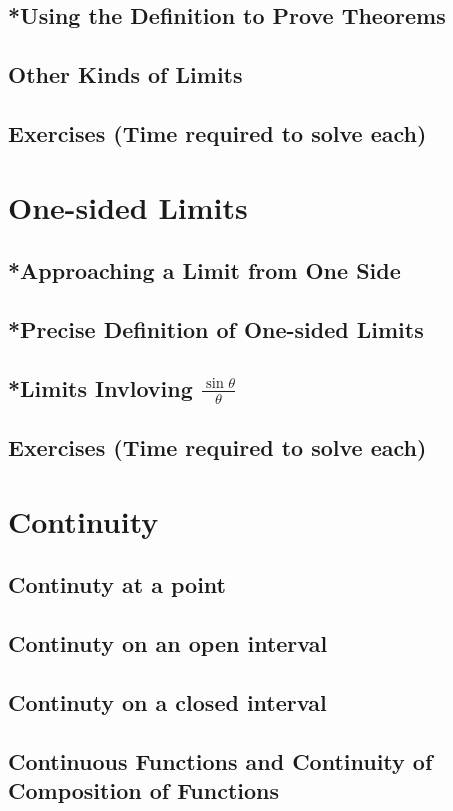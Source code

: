 \documentclass[11pt,letterpaper,twoside]{book}
\begin{document}
\subsection{*Using the Definition to Prove Theorems}
\subsection{Other Kinds of Limits}
\subsection{Exercises (Time required to solve each)}

\newpage
\section{One-sided Limits}
\subsection{*Approaching a Limit from One Side}
\subsection{*Precise Definition of One-sided Limits}
\subsection{*Limits Invloving $\frac{\sin\theta}{\theta}$}
\subsection{Exercises (Time required to solve each)}

\newpage
\section{Continuity}
\subsection{Continuty at a point}
\subsection{Continuty on an open interval}
\subsection{Continuty on a closed interval}
\subsection{Continuous Functions and Continuity of Composition of Functions}
\end{document}
